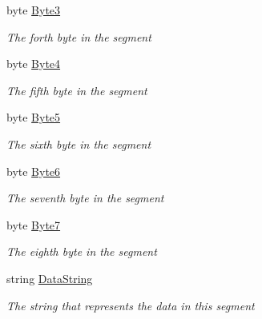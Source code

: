 \begin{DoxyCompactItemize}
byte \hyperlink{class_c_p_u___o_s___simulator_1_1_memory_1_1_memory_segment_aa8c335116132ff754331eadb12355247}{Byte3}
\begin{DoxyCompactList}\small\item\em The forth byte in the segment \end{DoxyCompactList}\item 
byte \hyperlink{class_c_p_u___o_s___simulator_1_1_memory_1_1_memory_segment_acc659c001dde3c6f6b0875df933b5bec}{Byte4}
\begin{DoxyCompactList}\small\item\em The fifth byte in the segment \end{DoxyCompactList}\item 
byte \hyperlink{class_c_p_u___o_s___simulator_1_1_memory_1_1_memory_segment_a8ef49453e406cd41eacc4e2ef16a8420}{Byte5}
\begin{DoxyCompactList}\small\item\em The sixth byte in the segment \end{DoxyCompactList}\item 
byte \hyperlink{class_c_p_u___o_s___simulator_1_1_memory_1_1_memory_segment_ade6f265c081bbfd184e344cb8af45c0b}{Byte6}
\begin{DoxyCompactList}\small\item\em The seventh byte in the segment \end{DoxyCompactList}\item 
byte \hyperlink{class_c_p_u___o_s___simulator_1_1_memory_1_1_memory_segment_a62699911957af71d57e7cb5cd21d5246}{Byte7}
\begin{DoxyCompactList}\small\item\em The eighth byte in the segment \end{DoxyCompactList}\item 
string \hyperlink{class_c_p_u___o_s___simulator_1_1_memory_1_1_memory_segment_a5e2dec75bb2978188d1fb369e4f9e982}{Data\+String}
\begin{DoxyCompactList}\small\item\em The string that represents the data in this segment \end{DoxyCompactList}\end{DoxyCompactItemize}

